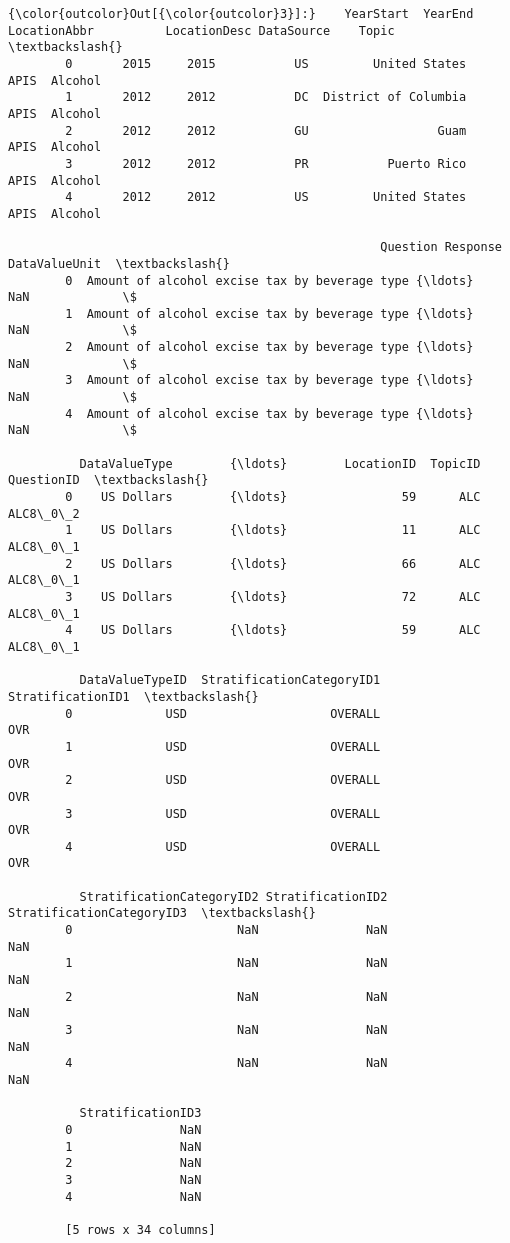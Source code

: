\documentclass[11pt]{article}
\begin{document}
\begin{Verbatim}[commandchars=\\\{\}]
{\color{outcolor}Out[{\color{outcolor}3}]:}    YearStart  YearEnd LocationAbbr          LocationDesc DataSource    Topic  \textbackslash{}
        0       2015     2015           US         United States       APIS  Alcohol   
        1       2012     2012           DC  District of Columbia       APIS  Alcohol   
        2       2012     2012           GU                  Guam       APIS  Alcohol   
        3       2012     2012           PR           Puerto Rico       APIS  Alcohol   
        4       2012     2012           US         United States       APIS  Alcohol   
        
                                                    Question Response DataValueUnit  \textbackslash{}
        0  Amount of alcohol excise tax by beverage type {\ldots}      NaN             \$   
        1  Amount of alcohol excise tax by beverage type {\ldots}      NaN             \$   
        2  Amount of alcohol excise tax by beverage type {\ldots}      NaN             \$   
        3  Amount of alcohol excise tax by beverage type {\ldots}      NaN             \$   
        4  Amount of alcohol excise tax by beverage type {\ldots}      NaN             \$   
        
          DataValueType        {\ldots}        LocationID  TopicID QuestionID  \textbackslash{}
        0    US Dollars        {\ldots}                59      ALC   ALC8\_0\_2   
        1    US Dollars        {\ldots}                11      ALC   ALC8\_0\_1   
        2    US Dollars        {\ldots}                66      ALC   ALC8\_0\_1   
        3    US Dollars        {\ldots}                72      ALC   ALC8\_0\_1   
        4    US Dollars        {\ldots}                59      ALC   ALC8\_0\_1   
        
          DataValueTypeID  StratificationCategoryID1  StratificationID1  \textbackslash{}
        0             USD                    OVERALL                OVR   
        1             USD                    OVERALL                OVR   
        2             USD                    OVERALL                OVR   
        3             USD                    OVERALL                OVR   
        4             USD                    OVERALL                OVR   
        
          StratificationCategoryID2 StratificationID2 StratificationCategoryID3  \textbackslash{}
        0                       NaN               NaN                       NaN   
        1                       NaN               NaN                       NaN   
        2                       NaN               NaN                       NaN   
        3                       NaN               NaN                       NaN   
        4                       NaN               NaN                       NaN   
        
          StratificationID3  
        0               NaN  
        1               NaN  
        2               NaN  
        3               NaN  
        4               NaN  
        
        [5 rows x 34 columns]
\end{Verbatim}
            
\end{document}
